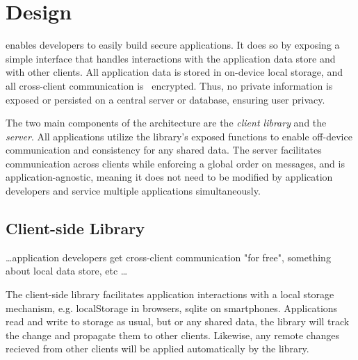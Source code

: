 \section{Design}




\name{} enables developers to easily build secure applications. It does
so by exposing a simple interface that handles interactions with the
application data store and with other clients. All application data is 
stored in on-device local storage, and all cross-client communication is \
encrypted. Thus, no private information is exposed or persisted on a 
central server or database, ensuring user privacy. 

The two main components of the \name{} architecture are the 
\textit{client library} and the \textit{\name{} server}. All \name{} 
applications utilize the library's exposed functions to enable 
off-device communication and consistency for any shared data. The server
facilitates communication across clients while enforcing a global order 
on messages, and is application-agnostic, meaning it does not need to be 
modified by application developers and service multiple applications 
simultaneously. 

\subsection{Client-side Library}
\dots application developers get cross-client communication "for free",
something about local data store, etc \dots

The \name{} client-side library facilitates application interactions with
a local storage mechanism, e.g. localStorage in browsers, sqlite on 
smartphones. Applications read and write to storage as usual, but or 
any shared data, the library will track the change and propagate them to
other clients. Likewise, any remote changes recieved from other clients
will be applied automatically by the library.


